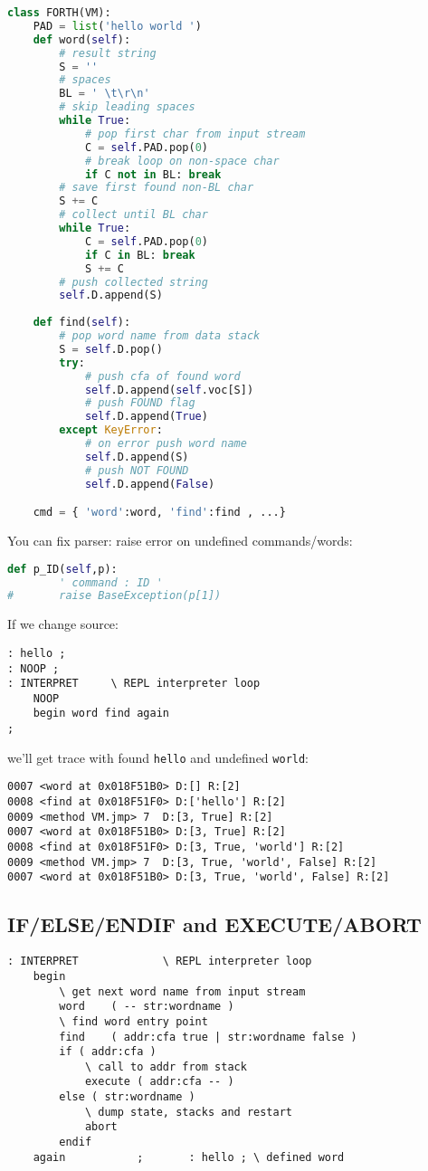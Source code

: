 \begin{lstlisting}[language=Python]
class FORTH(VM):
	PAD = list('hello world ')
	def word(self):
		# result string
		S = ''
		# spaces
		BL = ' \t\r\n'
		# skip leading spaces
		while True:
			# pop first char from input stream
			C = self.PAD.pop(0)
			# break loop on non-space char
			if C not in BL: break
		# save first found non-BL char
		S += C
		# collect until BL char
		while True:
			C = self.PAD.pop(0)
			if C in BL: break
			S += C
		# push collected string
		self.D.append(S)
	
	def find(self):
		# pop word name from data stack
		S = self.D.pop()
		try:
			# push cfa of found word
			self.D.append(self.voc[S])
			# push FOUND flag
			self.D.append(True)
		except KeyError:
			# on error push word name
			self.D.append(S)
			# push NOT FOUND
			self.D.append(False)

	cmd = { 'word':word, 'find':find , ...}
\end{lstlisting}
You can fix parser: raise error on undefined commands/words:
\begin{lstlisting}[language=Python]
  	def p_ID(self,p):
		' command : ID '
#		raise BaseException(p[1])
\end{lstlisting}

If we change source:
\begin{lstlisting}[language=Forth]
: hello ;
: NOOP ;
: INTERPRET		\ REPL interpreter loop
	NOOP
	begin word find again
;
\end{lstlisting}
we'll get trace with found \verb|hello| and undefined \verb|world|:
\begin{lstlisting}
0007 <word at 0x018F51B0> D:[] R:[2]
0008 <find at 0x018F51F0> D:['hello'] R:[2]
0009 <method VM.jmp> 7  D:[3, True] R:[2]
0007 <word at 0x018F51B0> D:[3, True] R:[2]
0008 <find at 0x018F51F0> D:[3, True, 'world'] R:[2]
0009 <method VM.jmp> 7  D:[3, True, 'world', False] R:[2]
0007 <word at 0x018F51B0> D:[3, True, 'world', False] R:[2]
\end{lstlisting}

\subsection{IF/ELSE/ENDIF and EXECUTE/ABORT}

\begin{lstlisting}[language=Forth]
: INTERPRET				\ REPL interpreter loop
	begin
		\ get next word name from input stream
		word	( -- str:wordname )
		\ find word entry point
		find 	( addr:cfa true | str:wordname false )
		if ( addr:cfa )
			\ call to addr from stack
			execute	( addr:cfa -- )
		else ( str:wordname )
			\ dump state, stacks and restart
			abort
		endif		
	again			;		: hello ; \ defined word
\end{lstlisting}

